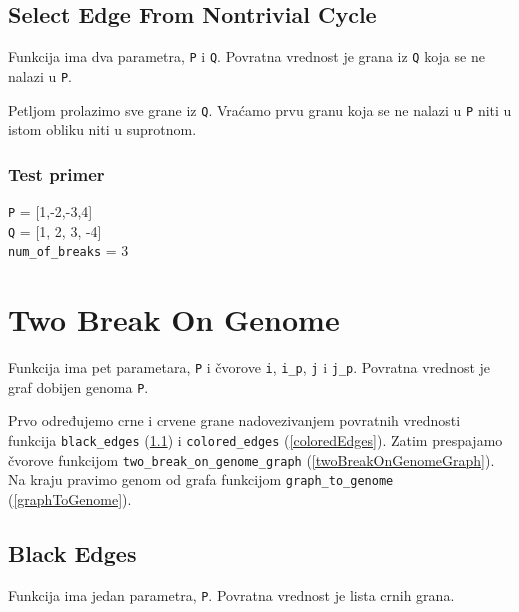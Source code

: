 

\subsection{Select Edge From Nontrivial Cycle}
\label{selectEdgeFromNontravialCycle}


Funkcija ima dva parametra, \texttt{P} i \texttt{Q}. Povratna vrednost je grana iz \texttt{Q} koja se ne nalazi u \texttt{P}.

Petljom prolazimo sve grane iz \texttt{Q}. Vraćamo prvu granu koja se ne nalazi u \texttt{P} niti u istom obliku niti u suprotnom.




\subsubsection{Test primer}

\noindent\texttt{P} =  [1,-2,-3,4]
\\\texttt{Q} = [1, 2, 3, -4]
\\\texttt{num\_of\_breaks} = 3


\section{Two Break On Genome}

Funkcija ima pet parametara, \texttt{P} i čvorove \texttt{i}, \texttt{i\_p}, \texttt{j} i \texttt{j\_p}. Povratna vrednost je graf dobijen genoma \texttt{P}.

Prvo određujemo crne i crvene grane nadovezivanjem povratnih vrednosti funkcija \texttt{black\_edges} (\ref{blackEdges}) i \texttt{colored\_edges} (\ref{coloredEdges}). Zatim prespajamo čvorove funkcijom \texttt{two\_break\_on\_genome\_graph} (\ref{twoBreakOnGenomeGraph}). Na kraju pravimo genom od grafa funkcijom \texttt{graph\_to\_genome} (\ref{graphToGenome}). 



\subsection{Black Edges}
\label{blackEdges}

Funkcija ima jedan parametra, \texttt{P}. Povratna vrednost je lista crnih grana.

